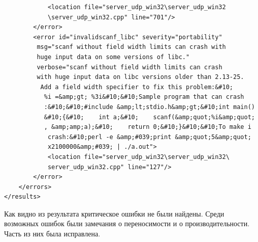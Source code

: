 \documentclass[10pt,a4paper]{report}
\begin{document}
\begin{lstlisting}
            <location file="server_udp_win32\server_udp_win32
            \server_udp_win32.cpp" line="701"/>
        </error>
        <error id="invalidscanf_libc" severity="portability"
         msg="scanf without field width limits can crash with 
         huge input data on some versions of libc." 
         verbose="scanf without field width limits can crash 
         with huge input data on libc versions older than 2.13-25.
          Add a field width specifier to fix this problem:&#10;   
           %i =&amp;gt; %3i&#10;&#10;Sample program that can crash
           :&#10;&#10;#include &amp;lt;stdio.h&amp;gt;&#10;int main()
           &#10;{&#10;    int a;&#10;    scanf(&amp;quot;%i&amp;quot;
           , &amp;amp;a);&#10;    return 0;&#10;}&#10;&#10;To make i
            crash:&#10;perl -e &amp;#039;print &amp;quot;5&amp;quot;
            x2100000&amp;#039; | ./a.out">
            <location file="server_udp_win32\server_udp_win32\
            server_udp_win32.cpp" line="127"/>
        </error>
    </errors>
</results>
\end{lstlisting}
Как видно из результата критическое ошибки не были найдены. Среди возможных ошибок были замечания о переносимости и о производительности. Часть из них была исправлена.
\end{document}
